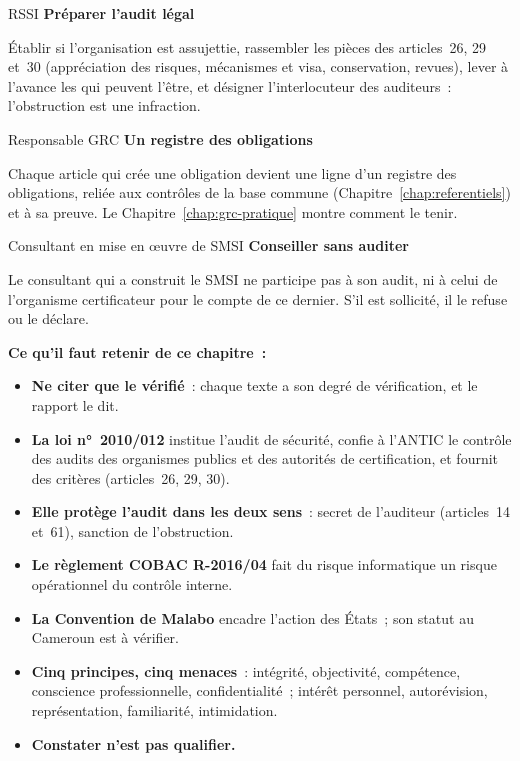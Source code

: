 \begin{boxmetier}{RSSI}
\textbf{Préparer l'audit légal}

Établir si l'organisation est assujettie, rassembler les pièces des
articles~26, 29 et~30 (appréciation des risques, mécanismes et visa,
conservation, revues), lever à l'avance les \NEK{} qui peuvent l'être, et
désigner l'interlocuteur des auditeurs~: l'obstruction est une infraction.
\end{boxmetier}

\begin{boxmetier}{Responsable GRC}
\textbf{Un registre des obligations}

Chaque article qui crée une obligation devient une ligne d'un registre des
obligations, reliée aux contrôles de la base commune
(Chapitre~\ref{chap:referentiels}) et à sa preuve. Le
Chapitre~\ref{chap:grc-pratique} montre comment le tenir.
\end{boxmetier}

\begin{boxmetier}{Consultant en mise en œuvre de SMSI}
\textbf{Conseiller sans auditer}

Le consultant qui a construit le SMSI ne participe pas à son audit, ni à
celui de l'organisme certificateur pour le compte de ce dernier. S'il est
sollicité, il le refuse ou le déclare.
\end{boxmetier}

\separateur

\begin{boxresume}
\textbf{Ce qu'il faut retenir de ce chapitre~:}
\begin{itemize}
    \item \textbf{Ne citer que le vérifié}~: chaque texte a son degré de
          vérification, et le rapport le dit.
    \item \textbf{La loi n°~2010/012} institue l'audit de sécurité, confie
          à l'ANTIC le contrôle des audits des organismes publics et des
          autorités de certification, et fournit des critères (articles~26,
          29, 30).
    \item \textbf{Elle protège l'audit dans les deux sens}~: secret de
          l'auditeur (articles~14 et~61), sanction de l'obstruction.
    \item \textbf{Le règlement COBAC R-2016/04} fait du risque informatique
          un risque opérationnel du contrôle interne.
    \item \textbf{La Convention de Malabo} encadre l'action des États~; son
          statut au Cameroun est à vérifier.
    \item \textbf{Cinq principes, cinq menaces}~: intégrité, objectivité,
          compétence, conscience professionnelle, confidentialité~; intérêt
          personnel, autorévision, représentation, familiarité,
          intimidation.
    \item \textbf{Constater n'est pas qualifier.}
\end{itemize}
\end{boxresume}

